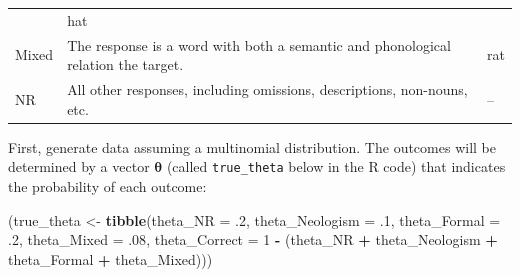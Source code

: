 \documentclass[12pt,]{krantz}
\newenvironment{Shaded}{\begin{snugshade}}{\end{snugshade}}
\newcommand{\DataTypeTok}[1]{\textcolor[rgb]{0.13,0.29,0.53}{#1}}
\newcommand{\DecValTok}[1]{\textcolor[rgb]{0.00,0.00,0.81}{#1}}
\newcommand{\FloatTok}[1]{\textcolor[rgb]{0.00,0.00,0.81}{#1}}
\newcommand{\KeywordTok}[1]{\textcolor[rgb]{0.13,0.29,0.53}{\textbf{#1}}}
\newcommand{\NormalTok}[1]{#1}
\newcommand{\OperatorTok}[1]{\textcolor[rgb]{0.81,0.36,0.00}{\textbf{#1}}}
\newcommand{\StringTok}[1]{\textcolor[rgb]{0.31,0.60,0.02}{#1}}
\theoremstyle{definition}
\theoremstyle{definition}
\theoremstyle{definition}
\theoremstyle{remark}
\begin{document}
\begin{longtable}[]{@{}lll@{}}
\begin{minipage}[t]{0.71\columnwidth}
\end{minipage} & \begin{minipage}[t]{0.06\columnwidth}\raggedright
hat\strut
\end{minipage}\tabularnewline
\begin{minipage}[t]{0.14\columnwidth}\raggedright
Mixed\strut
\end{minipage} & \begin{minipage}[t]{0.71\columnwidth}\raggedright
The response is a word with both a semantic and phonological relation the target.\strut
\end{minipage} & \begin{minipage}[t]{0.06\columnwidth}\raggedright
rat\strut
\end{minipage}\tabularnewline
\begin{minipage}[t]{0.14\columnwidth}\raggedright
NR\strut
\end{minipage} & \begin{minipage}[t]{0.71\columnwidth}\raggedright
All other responses, including omissions, descriptions, non-nouns, etc.\strut
\end{minipage} & \begin{minipage}[t]{0.06\columnwidth}\raggedright
--\strut
\end{minipage}\tabularnewline
\bottomrule
\end{longtable}

First, generate data assuming a multinomial distribution. The outcomes will be determined by a vector \(\boldsymbol{\theta}\) (called \texttt{true\_theta} below in the R code) that indicates the probability of each outcome:

\begin{Shaded}
\begin{Highlighting}[]
\NormalTok{(true_theta <-}\StringTok{ }\KeywordTok{tibble}\NormalTok{(}\DataTypeTok{theta_NR =} \FloatTok{.2}\NormalTok{, }
                     \DataTypeTok{theta_Neologism =} \FloatTok{.1}\NormalTok{,}
                     \DataTypeTok{theta_Formal =} \FloatTok{.2}\NormalTok{,}
                     \DataTypeTok{theta_Mixed =} \FloatTok{.08}\NormalTok{,}
                     \DataTypeTok{theta_Correct =}  \DecValTok{1} \OperatorTok{-}
\StringTok{                }\NormalTok{(theta_NR }\OperatorTok{+}\StringTok{ }\NormalTok{theta_Neologism }\OperatorTok{+}\StringTok{ }\NormalTok{theta_Formal }\OperatorTok{+}\StringTok{ }\NormalTok{theta_Mixed)))}
\end{Highlighting}
\end{Shaded}
\end{document}
